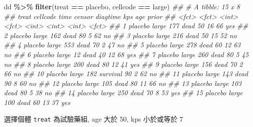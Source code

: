\documentclass[
]{book}
\newenvironment{Shaded}{\begin{snugshade}}{\end{snugshade}}
\newcommand{\CommentTok}[1]{\textcolor[rgb]{0.56,0.35,0.01}{\textit{#1}}}
\newcommand{\KeywordTok}[1]{\textcolor[rgb]{0.13,0.29,0.53}{\textbf{#1}}}
\newcommand{\NormalTok}[1]{#1}
\newcommand{\OperatorTok}[1]{\textcolor[rgb]{0.81,0.36,0.00}{\textbf{#1}}}
\newcommand{\StringTok}[1]{\textcolor[rgb]{0.31,0.60,0.02}{#1}}
\begin{document}
\begin{Shaded}
\begin{Highlighting}[]
\NormalTok{dd }\OperatorTok{\%\textgreater{}\%}\StringTok{ }
\StringTok{  }\KeywordTok{filter}\NormalTok{(treat }\OperatorTok{==}\StringTok{ \textquotesingle{}placebo\textquotesingle{}}\NormalTok{, cellcode }\OperatorTok{==}\StringTok{ \textquotesingle{}large\textquotesingle{}}\NormalTok{)}
\CommentTok{\#\# \# A tibble: 15 x 8}
\CommentTok{\#\#    treat   cellcode  time censor   diagtime   kps   age prior}
\CommentTok{\#\#    \textless{}fct\textgreater{}   \textless{}fct\textgreater{}    \textless{}int\textgreater{} \textless{}fct\textgreater{}       \textless{}int\textgreater{} \textless{}int\textgreater{} \textless{}int\textgreater{} \textless{}fct\textgreater{}}
\CommentTok{\#\#  1 placebo large      177 dead           50    16    66 yes  }
\CommentTok{\#\#  2 placebo large      162 dead           80     5    62 no   }
\CommentTok{\#\#  3 placebo large      216 dead           50    15    52 no   }
\CommentTok{\#\#  4 placebo large      553 dead           70     2    47 no   }
\CommentTok{\#\#  5 placebo large      278 dead           60    12    63 no   }
\CommentTok{\#\#  6 placebo large       12 dead           40    12    68 yes  }
\CommentTok{\#\#  7 placebo large      260 dead           80     5    45 no   }
\CommentTok{\#\#  8 placebo large      200 dead           80    12    41 yes  }
\CommentTok{\#\#  9 placebo large      156 dead           70     2    66 no   }
\CommentTok{\#\# 10 placebo large      182 survival       90     2    62 no   }
\CommentTok{\#\# 11 placebo large      143 dead           90     8    60 no   }
\CommentTok{\#\# 12 placebo large      105 dead           80    11    66 no   }
\CommentTok{\#\# 13 placebo large      103 dead           80     5    38 no   }
\CommentTok{\#\# 14 placebo large      250 dead           70     8    53 yes  }
\CommentTok{\#\# 15 placebo large      100 dead           60    13    37 yes}
\end{Highlighting}
\end{Shaded}

選擇個體 \texttt{treat} 為試驗藥組, age 大於 50, kps 小於或等於 7
\end{document}
